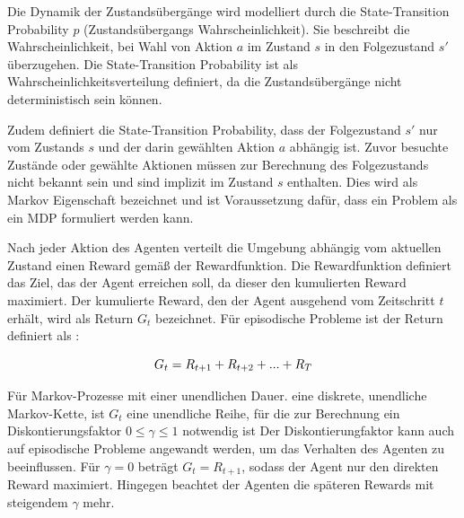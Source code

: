 Die Dynamik der Zustandsübergänge wird modelliert durch die State-Transition Probability $p$ (\dt Zustandsübergangs Wahrscheinlichkeit). 
Sie beschreibt die Wahrscheinlichkeit, bei Wahl von Aktion $a$ im Zustand $s$ in den Folgezustand $s'$ überzugehen.
Die State-Transition Probability ist als Wahrscheinlichkeitsverteilung definiert, da die Zustandsübergänge nicht deterministisch sein können. 

Zudem definiert die State-Transition Probability, dass der Folgezustand $s'$ nur vom Zustands $s$ und der darin gewählten Aktion $a$ abhängig ist. 
Zuvor besuchte Zustände oder gewählte Aktionen müssen zur Berechnung des Folgezustands nicht bekannt sein und sind implizit im Zustand $s$ enthalten. Dies wird als Markov Eigenschaft bezeichnet und ist Voraussetzung dafür, dass ein Problem als ein \ac{MDP} formuliert werden kann. \cite[S. 66]{suttonLearningPredictMethods1988}

Nach jeder Aktion des Agenten verteilt die Umgebung abhängig vom aktuellen Zustand einen Reward gemäß der Rewardfunktion. 
Die Rewardfunktion definiert das Ziel, das der Agent erreichen soll, da dieser den kumulierten Reward maximiert.
Der kumulierte Reward, den der Agent ausgehend vom Zeitschritt $t$ erhält, wird als Return $G_t$ bezeichnet. 
Für episodische Probleme ist der Return definiert als \cite[S. 54]{suttonReinforcementLearningIntroduction2018}:

\begin{equation}
    \label{eq:return_episodic}
    \equationentry{Berechnung Return $G_t$ für episodische Probleme}
    G_t=R_{t+1}+R_{t+2}+...+R_T
\end{equation}

Für Markov-Prozesse mit einer unendlichen Dauer. \dahe eine diskrete, unendliche Markov-Kette, ist $G_t$ eine unendliche Reihe, für die zur Berechnung ein Diskontierungsfaktor  $0 \le \gamma \le 1$ notwendig ist
Der Diskontierungfaktor kann auch auf episodische Probleme angewandt werden, um das Verhalten des Agenten zu beeinflussen. 
Für $\gamma=0$ beträgt $G_t= R_{t+1}$, sodass der Agent nur den direkten Reward maximiert. 
Hingegen beachtet der Agenten die späteren Rewards mit steigendem $\gamma$ mehr. \cite[S. 55f.]{suttonReinforcementLearningIntroduction2018}

